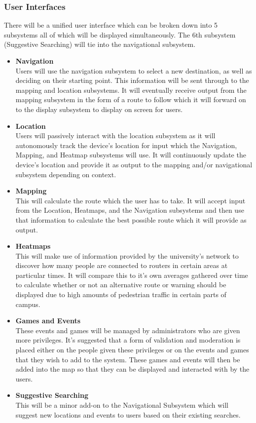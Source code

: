 \documentclass[english]{article}
\begin{document}
					    \subsubsection{User Interfaces}
					     There will be a unified user interface which can be broken down into 5 subsystems all of which will be displayed simultaneously. The 6th subsystem (Suggestive Searching) will tie into the navigational subsystem.\\
					    \begin{itemize}
					        \item \textbf{Navigation}\\
					        Users will use the navigation subsystem to select a new destination, as well as deciding on their starting point. This information will be sent through to the mapping and location subsystems. It will eventually receive output from the mapping subsystem in the form of a route to follow which it will forward on to the display subsystem to display on screen for users.
					        \item \textbf{Location}\\
					        Users will passively interact with the location subsystem as it will autonomously track the device's location for input which the Navigation, Mapping, and Heatmap subsystems will use. It will continuously update the device's location and provide it as output to the mapping and/or navigational subsystem depending on context.
					        \item \textbf{Mapping}\\
					        This will calculate the route which the user has to take. It will accept input from the Location, Heatmaps, and the Navigation subsystems and then use that information to calculate the best possible route which it will provide as output.
					        \item \textbf{Heatmaps}\\
					        This will make use of information provided by the university's network to discover how many people are connected to routers in certain areas at particular times. It will compare this to it's own averages gathered over time to calculate whether or not an alternative route or warning should be displayed due to high amounts of pedestrian traffic in certain parts of campus.
					        \item \textbf{Games and Events}\\
					        These events and games will be managed by administrators who are given more privileges. It's suggested that a form of validation and moderation is placed either on the people given these privileges or on the events and games that they wish to add to the system. These games and events will then be added into the map so that they can be displayed and interacted with by the users.
					        \item \textbf{Suggestive Searching}\\
					        This will be a minor add-on to the Navigational Subsystem which will suggest new locations and events to users based on their existing searches.	        
					        
					    \end{itemize}
\end{document}
